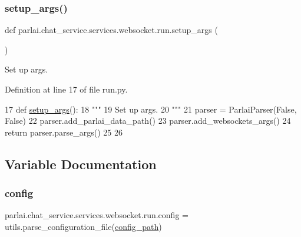 \subsubsection{\texorpdfstring{setup\+\_\+args()}{setup\_args()}}
{\footnotesize\ttfamily def parlai.\+chat\+\_\+service.\+services.\+websocket.\+run.\+setup\+\_\+args (\begin{DoxyParamCaption}{ }\end{DoxyParamCaption})}

\begin{DoxyVerb}Set up args.
\end{DoxyVerb}
 

Definition at line 17 of file run.\+py.


\begin{DoxyCode}
17 \textcolor{keyword}{def }\hyperlink{namespaceparlai_1_1tasks_1_1talkthewalk_1_1run_a3534e8afa0a4dc25a6e02740fa35ac84}{setup\_args}():
18     \textcolor{stringliteral}{"""}
19 \textcolor{stringliteral}{    Set up args.}
20 \textcolor{stringliteral}{    """}
21     parser = ParlaiParser(\textcolor{keyword}{False}, \textcolor{keyword}{False})
22     parser.add\_parlai\_data\_path()
23     parser.add\_websockets\_args()
24     \textcolor{keywordflow}{return} parser.parse\_args()
25 
26 
\end{DoxyCode}


\subsection{Variable Documentation}
\mbox{\label{namespaceparlai_1_1chat__service_1_1services_1_1websocket_1_1run_ac583a14d08de85e9c7be6267d13b1a91}} 
\subsubsection{\texorpdfstring{config}{config}}
{\footnotesize\ttfamily parlai.\+chat\+\_\+service.\+services.\+websocket.\+run.\+config = utils.\+parse\+\_\+configuration\+\_\+file(\hyperlink{namespaceparlai_1_1chat__service_1_1services_1_1websocket_1_1run_a33e4ea49b968523396e63dcb91524031}{config\+\_\+path})}



